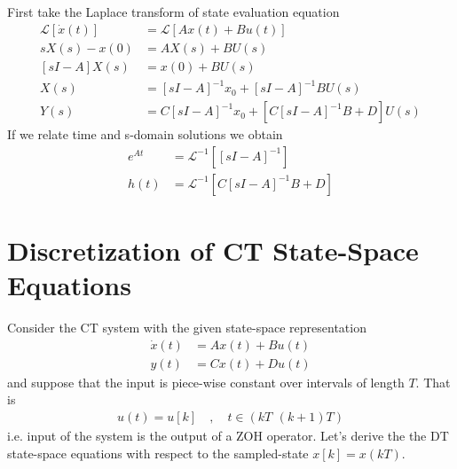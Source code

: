 \documentclass[twoside]{article}
\begin{document}
First take the Laplace transform of state evaluation equation
%
\begin{align*}
\mathcal{L} \left[ \dot{x}(t) \right] &= \mathcal{L} \left[  A x(t) + B u(t) \right]
\\
s X(s) - x(0) &= A X(s) + B U(s)
\\
[s I - A]  X(s) &= x(0) + B U(s)
\\
X(s) &= [s I - A]^{-1} x_0 + [s I - A]^{-1} B U(s)
\\
Y(s) &= C [s I - A]^{-1} x_0 + \left[ C [s I - A]^{-1} B + D\right] U(s)
\end{align*}
%
If we relate time and s-domain solutions we obtain
%
\begin{align*}
  e^{A t} &= \mathcal{L}^{-1} \left[ [s I - A]^{-1} \right]
\\
  h(t) &= \mathcal{L}^{-1} \left[ C [s I - A]^{-1} B + D \right]
\end{align*}

\section*{Discretization of CT State-Space Equations}

Consider the CT system with the given state-space representation
%
%
\begin{align*}
  \dot{x}(t) &= A x(t) + B u(t)
\\
  y(t) &= C x(t) + D u(t)
\end{align*}
%
and suppose that the input is piece-wise constant over intervals of
length $T$. That is
%
\begin{align*}
  u(t) = u[k] \quad , \quad t \in ( kT \, \ (k+1) T)
\end{align*}
%
i.e. input of the system is the output of a ZOH operator. Let's derive the
the DT state-space equations with respect to the sampled-state 
$x[k] = x(kT)$.
\end{document}
